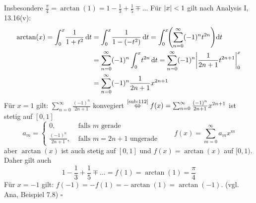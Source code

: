 \begin{enumerate}[(i)]
\[	\]
	Insbesondere $\frac{\pi }{4} = \arctan (1) = 1 - \frac{1}{3} + \frac{1}{5} \mp \ldots  $
	Für $\abs*{x} < 1 $ gilt nach Analysis I, 13.16(v):
	\begin{align*}
		\arctan(x) = \int_{0} ^{x} \! \frac{1}{1+t^2}  \, \mathrm{d}t &= \int_{0} ^{x} \! \frac{1}{1- (-t^2)}  \, \mathrm{d}t = \int_{0} ^{x} \! 
		\enbrace*{\sum_{n=0}^{\infty} (-1)^n t^{2n}}  \mathrm{d}t  \\
		&= \sum_{n=0}^{\infty} (-1)^n \int_{0} ^{x} \! t^{2n}  \, \mathrm{d}t = \sum_{n=0}^{\infty} (-1)^n \abs*{\frac{1}{2n+1} t^{2n+1} }_0^x \\
		&= \sum_{n=0}^{\infty} (-1)^n \frac{1}{2n+1} x^{2n+1} 
	\end{align*}
	Für $x=1$ gilt: $\sum_{n=0}^{\infty} \frac{(-1)^n}{2n+1} $ konvegiert $\overset{\text{\ref{sub:112}}}{\Leftrightarrow} f(x) 
	= \sum_{n=0}^{\infty} \frac{(-1)^n}{2n+1} x^{2n+1} $ ist stetig auf $[0,1]$
	\[
		a_m = \begin{cases}
			0, &\text{ falls $m$ gerade}\\
			\frac{(-1)^n}{2n+1}, &\text{ falls } m=2n+1 \text{ ungerade} 
		\end{cases} \qquad f(x) = \sum_{m=0}^{\infty} a_m x^m
	\]
	aber $\arctan(x)$ ist auch stetig auf $[0,1]$ und $f(x)=\arctan(x)$ auf $[0,1)$. Daher gilt auch 
	\[
		1- \frac{1}{3} + \frac{1}{5} \mp \ldots  =f(1)= \arctan(1)= \frac{\pi }{4} 
	\]
	Für $x=-1$ gilt: $f(-1)= - f(1)= - \arctan(1) = \arctan (-1)$. {\footnotesize (vgl. Ana, Beispiel 7.8)} \hfill \( \square \)
\end{enumerate}

